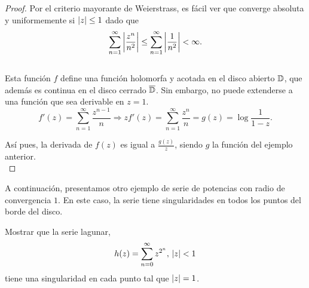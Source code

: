 \begin{proof}
    Por el criterio mayorante de Weierstrass, es fácil ver que converge absoluta y uniformemente si $\left\lvert z\right\rvert \leq 1$ dado que
    \begin{equation*}
        \sum_{n=1}^{\infty} \left\lvert\frac{z^n}{n^2}\right\rvert \leq \sum_{n=1}^{\infty} \left\lvert\frac{1}{n^2}\right\rvert < \infty.
    \end{equation*}
    \\
    Esta función $f$ define una función holomorfa y acotada en el disco abierto $\mathbb{D}$, que además es continua en el disco cerrado $\overline{\mathbb{D}}$. Sin embargo, no puede extenderse a una función que sea derivable en $z = 1$. \\
    \begin{equation*}
        f'(z) =  \sum_{n=1}^{\infty} \frac{z^{n-1}}{n} \Rightarrow zf'(z) = \sum_{n=1}^{\infty} \frac{z^{n}}{n} = g(z) = \log{\frac{1}{1 - z}}.
    \end{equation*}

    Así pues, la derivada de $f(z)$ es igual a $\frac{g(z)}{z}$, siendo $g$ la función del ejemplo anterior. \\
\end{proof}


A continuación, presentamos otro ejemplo de serie de potencias con radio de convergencia $1$. En este caso, la serie tiene singularidades en todos los puntos del borde del disco. \\

\begin{example}
    Mostrar que la serie lagunar,
    \begin{equation*}
        h(z) = \sum_{n=0}^{\infty}  z^{2^n}, \, \left\lvert z\right\rvert < 1
    \end{equation*}
 tiene una singularidad en cada punto tal que $\left\lvert z\right\rvert = 1$.
\end{example}

